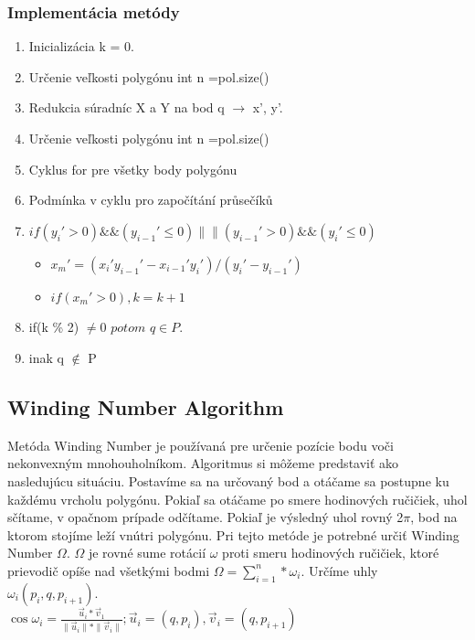 \documentclass[12pt]{article}
\begin{document}
\subsubsection {Implementácia metódy}
\begin{enumerate}
\item Inicializácia k = 0.
\item Určenie veľkosti polygónu int n =pol.size()
\item Redukcia súradníc X a Y na bod q $\to$ x', y'.
\item Určenie veľkosti polygónu int n =pol.size()
\item Cyklus for pre všetky body polygónu
\item Podmínka v cyklu pro započítání průsečíků
\item[] $if(y_i' >0) \&\& (y_{i-1}' \leq 0) \|\| (y_{i-1}' > 0) \&\& (y_i' \leq 0)$

\begin{itemize}
\item[] $x_m'=(x_i'y_{i-1}'-x_{i-1}'y_i')/(y_i'-y_{i-1}')$
\item[] $if(x_m'>0), k = k+1$
\end{itemize}

\item if(k \% 2) $\neq 0$ $potom$ $q \in P$.
\item inak q $\notin$ P
\end{enumerate}

\subsection {Winding Number Algorithm}

Metóda Winding Number je používaná pre určenie pozície bodu voči nekonvexným mnohouholníkom. Algoritmus si môžeme predstaviť ako nasledujúcu situáciu. Postavíme sa na určovaný bod a otáčame sa postupne ku každému vrcholu polygónu. Pokiaľ sa otáčame po smere hodinových ručičiek, uhol sčítame, v opačnom prípade odčítame. Pokiaľ je výsledný uhol rovný 2$\pi$, bod na ktorom stojíme leží vnútri polygónu. Pri tejto metóde je potrebné určiť Winding Number $\Omega$. $\Omega$ je rovné sume rotácií $\omega$ proti smeru hodinových ručičiek, ktoré prievodič opíše nad všetkými bodmi $\Omega = \sum_{i=1}^{n}*\omega_i$. Určíme uhly $\omega_i(p_i,q,p_{i+1})$. \\[2pt]

$\cos \omega_i = \frac{\vec u_i *\vec v_1}{\parallel \vec u_i \parallel*\parallel \vec v_i \parallel}; \vec u_i = (q, p_i), \vec v_i = (q, p_{i+1})$ \\[2pt]
\end{document}
